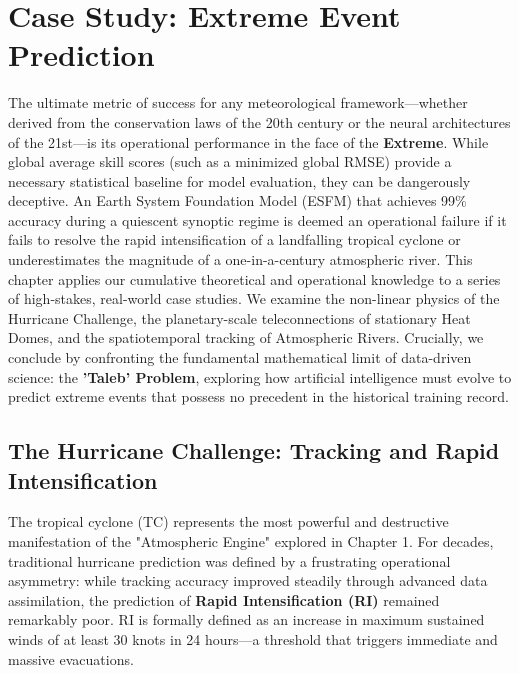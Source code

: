 \chapter{Case Study: Extreme Event Prediction}

The ultimate metric of success for any meteorological framework—whether derived from the conservation laws of the 20th century or the neural architectures of the 21st—is its operational performance in the face of the \textbf{Extreme}. While global average skill scores (such as a minimized global RMSE) provide a necessary statistical baseline for model evaluation, they can be dangerously deceptive. An Earth System Foundation Model (ESFM) that achieves 99\% accuracy during a quiescent synoptic regime is deemed an operational failure if it fails to resolve the rapid intensification of a landfalling tropical cyclone or underestimates the magnitude of a one-in-a-century atmospheric river. This chapter applies our cumulative theoretical and operational knowledge to a series of high-stakes, real-world case studies. We examine the non-linear physics of the Hurricane Challenge, the planetary-scale teleconnections of stationary Heat Domes, and the spatiotemporal tracking of Atmospheric Rivers. Crucially, we conclude by confronting the fundamental mathematical limit of data-driven science: the \textbf{'Taleb' Problem}, exploring how artificial intelligence must evolve to predict extreme events that possess no precedent in the historical training record.

\section{The Hurricane Challenge: Tracking and Rapid Intensification}

The tropical cyclone (TC) represents the most powerful and destructive manifestation of the "Atmospheric Engine" explored in Chapter 1. For decades, traditional hurricane prediction was defined by a frustrating operational asymmetry: while tracking accuracy improved steadily through advanced data assimilation, the prediction of \textbf{Rapid Intensification (RI)} remained remarkably poor. RI is formally defined as an increase in maximum sustained winds of at least 30 knots in 24 hours—a threshold that triggers immediate and massive evacuations.

